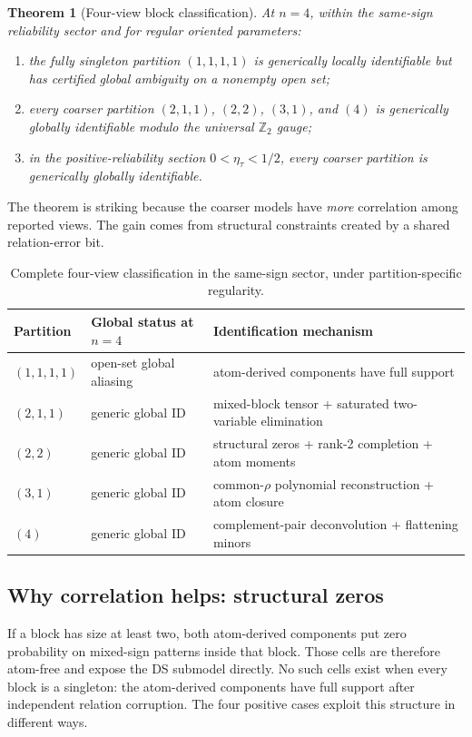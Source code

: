 \documentclass[11pt]{article}
\newtheorem{theorem}{Theorem}
\theoremstyle{definition}
\theoremstyle{remark}
\newcommand{\Ztwo}{\mathbb{Z}_2}
\begin{document}
\begin{theorem}[Four-view block classification]
\label{thm:block}
At $n=4$, within the same-sign reliability sector and for regular oriented parameters:
\begin{enumerate}
\item the fully singleton partition $(1,1,1,1)$ is generically locally identifiable but has certified global ambiguity on a nonempty open set;
\item every coarser partition $(2,1,1)$, $(2,2)$, $(3,1)$, and $(4)$ is generically globally identifiable modulo the universal $\Ztwo$ gauge;
\item in the positive-reliability section $0<\eta_\tau<1/2$, every coarser partition is generically globally identifiable.
\end{enumerate}
\end{theorem}

The theorem is striking because the coarser models have \emph{more} correlation among reported views. The gain comes from structural constraints created by a shared relation-error bit.

\begin{table}[t]
\centering\small
\begin{tabular}{@{}lll@{}}
\toprule
Partition & Global status at $n=4$ & Identification mechanism\\
\midrule
$(1,1,1,1)$ & open-set global aliasing & atom-derived components have full support\\
$(2,1,1)$ & generic global ID & mixed-block tensor + saturated two-variable elimination\\
$(2,2)$ & generic global ID & structural zeros + rank-2 completion + atom moments\\
$(3,1)$ & generic global ID & common-$\rho$ polynomial reconstruction + atom closure\\
$(4)$ & generic global ID & complement-pair deconvolution + flattening minors\\
\bottomrule
\end{tabular}
\caption{Complete four-view classification in the same-sign sector, under partition-specific regularity.}
\label{tab:block}
\end{table}

\subsection{Why correlation helps: structural zeros}

If a block has size at least two, both atom-derived components put zero probability on mixed-sign patterns inside that block. Those cells are therefore atom-free and expose the DS submodel directly. No such cells exist when every block is a singleton: the atom-derived components have full support after independent relation corruption. The four positive cases exploit this structure in different ways.
\end{document}
